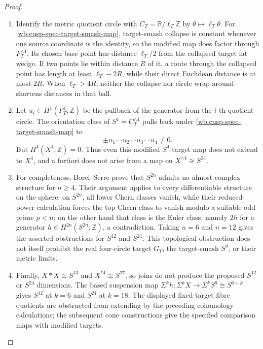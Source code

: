 \begin{proof}
\begin{enumerate}[label=\arabic*.,leftmargin=*]
\item Identify the metric quotient circle with
\(C_T=\mathbb R/\ell_T\mathbb Z\) by
\(\theta\mapsto\ell_T\theta\).  For
\cref{wb:cusp-spec-target-smash-map}, target-smash collapse is constant
whenever one source coordinate is the identity, so the modified map does
factor through \(F_T^{\wedge4}\).  Its chosen base point has distance
\(\ell_T/2\) from the collapsed target fat wedge.  If two points lie
within distance \(R\) of it, a route through the collapsed point has
length at least \(\ell_T-2R\), while their direct Euclidean distance is at
most \(2R\).  When \(\ell_T>4R\), neither the collapse nor circle
wrap-around shortens distances in that ball.

\item Let \(u_i\in H^1(F_T^4;\mathbb Z)\) be the pullback of the generator from
the \(i\)-th quotient circle.  The orientation class of
\(S^4=C_T^{\wedge4}\) pulls back under
\cref{wb:cusp-spec-target-smash-map} to
\[
 \pm u_1\smile u_2\smile u_3\smile u_4\ne0.
\]
But \(H^4(X^4;\mathbb Z)=0\).  Thus even this modified \(S^4\)-target map
does not extend to \(X^4\), and a fortiori does not arise from a map on
\(X^{\wedge4}\cong S^{24}\).

\item For completeness, Borel--Serre prove that \(S^{2n}\) admits no
almost-complex structure for \(n\ge4\).  Their argument applies to every
differentiable structure on the sphere: on \(S^{2n}\), all lower Chern
classes vanish, while their reduced-power calculation forces the top
Chern class to vanish modulo a suitable odd prime \(p<n\); on the other
hand that class is the Euler class, namely \(2h\) for a generator
\(h\in H^{2n}(S^{2n};\mathbb Z)\), a contradiction.  Taking \(n=6\) and
\(n=12\) gives the asserted obstructions for \(S^{12}\) and \(S^{24}\).
This topological obstruction does not itself prohibit the real
four-circle target \(G_T\), the target-smash \(S^4\), or their metric
limits.

\item Finally,
\(X*X\cong S^{13}\) and \(X^{*4}\cong S^{27}\), so joins do not produce
the proposed \(S^{12}\) or \(S^{24}\) dimensions.  The based suspension map $\Sigma^k h:\Sigma^k X\to\Sigma^k S^6\cong S^{6+k}$ gives $S^{12}$ at $k=6$ and $S^{24}$ at $k=18$. The displayed fixed-target fibre quotients are obstructed from extending by the preceding cohomology calculations; the subsequent cone constructions give the specified comparison maps with modified targets.
\end{enumerate}
\end{proof}

